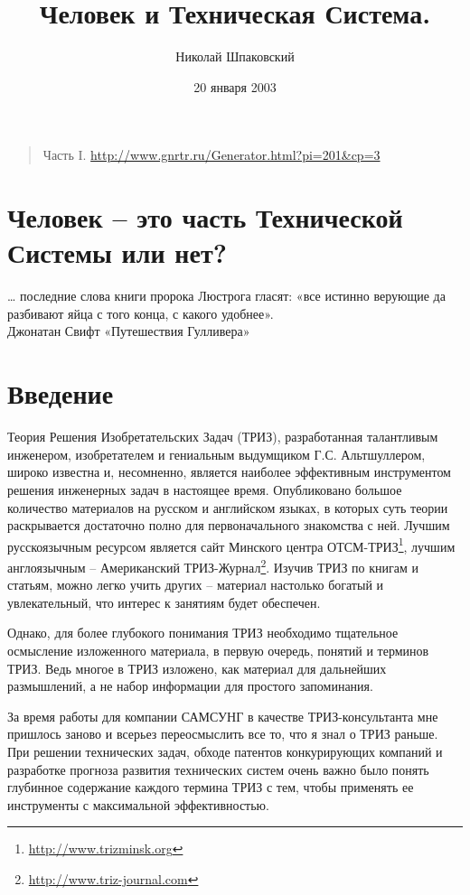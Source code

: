 \documentclass[11pt,a4paper]{article}
\title{Человек и Техническая Система. }
\author{Николай Шпаковский}
\date{20 января 2003}
\begin{document}
\maketitle

\begin{quote}
  Часть I. \url{http://www.gnrtr.ru/Generator.html?pi=201&cp=3}
\end{quote}

\section*{Человек – это часть Технической Системы или нет?}

\begin{flushright}
  \ldots{} последние слова книги пророка Люстрога гласят: «все истинно верующие
  да разбивают яйца с того конца, с какого удобнее». \\ 
  Джонатан Свифт «Путешествия Гулливера» 
\end{flushright}

\section*{Введение}
Теория Решения Изобретательских Задач (ТРИЗ), разработанная талантливым
инженером, изобретателем и гениальным выдумщиком Г.С. Альтшуллером, широко
известна и, несомненно, является наиболее эффективным инструментом решения
инженерных задач в настоящее время. Опубликовано большое количество материалов
на русском и английском языках, в которых суть теории раскрывается достаточно
полно для первоначального знакомства с ней. Лучшим русскоязычным ресурсом
является сайт Минского центра
ОТСМ-ТРИЗ\footnote{\url{http://www.trizminsk.org}}, лучшим англоязычным –
Американский ТРИЗ-Журнал\footnote{\url{http://www.triz-journal.com}}.  Изучив
ТРИЗ по книгам и статьям, можно легко учить других – материал настолько
богатый и увлекательный, что интерес к занятиям будет обеспечен.

Однако, для более глубокого понимания ТРИЗ необходимо тщательное осмысление
изложенного материала, в первую очередь, понятий и терминов ТРИЗ. Ведь многое
в ТРИЗ изложено, как материал для дальнейших размышлений, а не набор
информации для простого запоминания.

За время работы для компании САМСУНГ в качестве ТРИЗ-консультанта мне пришлось
заново и всерьез переосмыслить все то, что я знал о ТРИЗ раньше. При решении
технических задач, обходе патентов конкурирующих компаний и разработке
прогноза развития технических систем очень важно было понять глубинное
содержание каждого термина ТРИЗ с тем, чтобы применять ее инструменты с
максимальной эффективностью.
\end{document}
